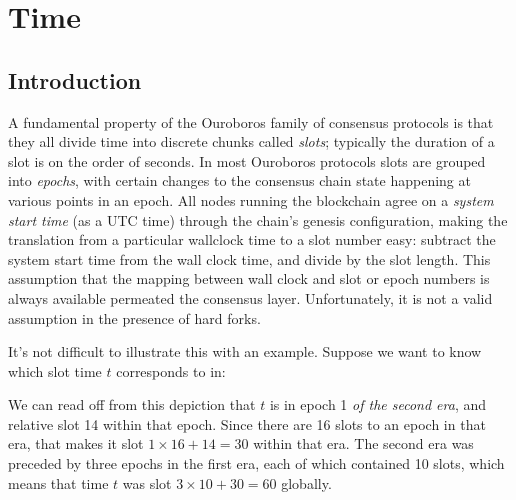 \newcommand{\timeconv}[2]{\ensuremath{\mathtt{Conv}_{#1}(#2)}}
\newcommand{\applyBlocks}[2]{\ensuremath{\mathtt{apply}_\mathit{#1}(#2)}}
\newcommand{\ledgertip}[1]{\ensuremath{\mathtt{tip}(#1)}}
\newcommand{\switch}[3]{\ensuremath{\mathtt{switch}_{(\mathit{#1},\;\mathit{#2})}(#3)}}

\chapter{Time}
\label{time}

\section{Introduction}
\label{time:introduction}

A fundamental property of the Ouroboros family of consensus protocols is that
they all divide time into discrete chunks called \emph{slots}; typically the
duration of a slot is on the order of seconds. In most Ouroboros protocols slots
are grouped into \emph{epochs}, with certain changes to the consensus chain
state happening at various points in an epoch. All nodes running the blockchain
agree on a \emph{system start time} (as a UTC time) through the chain's genesis
configuration, making the translation from a particular wallclock time to a slot
number easy: subtract the system start time from the wall clock time, and
divide by the slot length. This assumption that the mapping between wall clock
and slot or epoch numbers is always available permeated the consensus layer.
Unfortunately, it is not a valid assumption in the presence of hard forks.

It's not difficult to illustrate this with an example. Suppose we want to know
which slot time $t$ corresponds to in:
%
\begin{center}
\end{center}
%
We can read off from this depiction that $t$ is in epoch 1 \emph{of the second
era}, and relative slot 14 within that epoch. Since there are 16 slots to an
epoch in that era, that makes it slot $1 \times 16 + 14 = 30$ within that era.
The second era was preceded by three epochs in the first era, each of which
contained 10 slots, which means that time $t$ was slot $3 \times 10 + 30 = 60$
globally.

